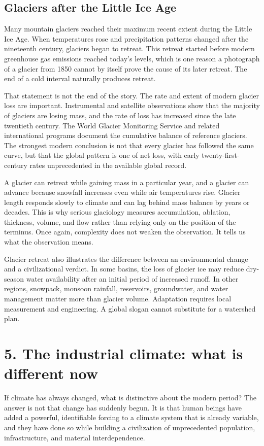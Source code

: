 ﻿\documentclass[12pt,a4paper]{book}
\begin{document}
\subsection{Glaciers after the Little Ice Age}
Many mountain glaciers reached their maximum recent extent during the Little Ice Age. When temperatures rose and precipitation patterns changed after the nineteenth century, glaciers began to retreat. This retreat started before modern greenhouse gas emissions reached today's levels, which is one reason a photograph of a glacier from 1850 cannot by itself prove the cause of its later retreat. The end of a cold interval naturally produces retreat.

That statement is not the end of the story. The rate and extent of modern glacier loss are important. Instrumental and satellite observations show that the majority of glaciers are losing mass, and the rate of loss has increased since the late twentieth century. The World Glacier Monitoring Service and related international programs document the cumulative balance of reference glaciers. The strongest modern conclusion is not that every glacier has followed the same curve, but that the global pattern is one of net loss, with early twenty-first-century rates unprecedented in the available global record. \cite{Copernicus2026Glaciers,WGMSLatestGlacierData}

A glacier can retreat while gaining mass in a particular year, and a glacier can advance because snowfall increases even while air temperatures rise. Glacier length responds slowly to climate and can lag behind mass balance by years or decades. This is why serious glaciology measures accumulation, ablation, thickness, volume, and flow rather than relying only on the position of the terminus. Once again, complexity does not weaken the observation. It tells us what the observation means.

Glacier retreat also illustrates the difference between an environmental change and a civilizational verdict. In some basins, the loss of glacier ice may reduce dry-season water availability after an initial period of increased runoff. In other regions, snowpack, monsoon rainfall, reservoirs, groundwater, and water management matter more than glacier volume. Adaptation requires local measurement and engineering. A global slogan cannot substitute for a watershed plan.

\section{5. The industrial climate: what is different now}
If climate has always changed, what is distinctive about the modern period? The answer is not that change has suddenly begun. It is that human beings have added a powerful, identifiable forcing to a climate system that is already variable, and they have done so while building a civilization of unprecedented population, infrastructure, and material interdependence.
\end{document}
